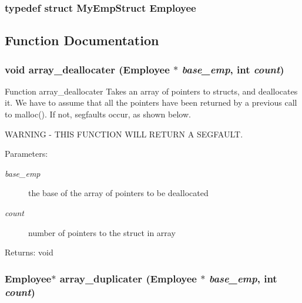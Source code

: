 \subsubsection{\setlength{\rightskip}{0pt plus 5cm}typedef struct \bf{My\-Emp\-Struct} \bf{Employee}}\label{mystructs_8h_d17652ded0ad47dadf7dc684a5873f82}




\subsection{Function Documentation}
\subsubsection{\setlength{\rightskip}{0pt plus 5cm}void array\_\-deallocater (\bf{Employee} $\ast$ {\em base\_\-emp}, int {\em count})}\label{mystructs_8h_a103294d8edeca5292a7d24428976feb}


Function array\_\-deallocater Takes an array of pointers to structs, and deallocates it. We have to assume that all the pointers have been returned by a previous call to malloc(). If not, segfaults occur, as shown below.

WARNING - THIS FUNCTION WILL RETURN A SEGFAULT.

\begin{Desc}
\item[Parameters:]
\begin{description}
\item[{\em base\_\-emp}]the base of the array of pointers to be deallocated \item[{\em count}]number of pointers to the struct in array \end{description}
\end{Desc}
\begin{Desc}
\item[Returns:]void \end{Desc}
\subsubsection{\setlength{\rightskip}{0pt plus 5cm}\bf{Employee}$\ast$ array\_\-duplicater (\bf{Employee} $\ast$ {\em base\_\-emp}, int {\em count})}\label{mystructs_8h_df3e953715ca2fbe495f259c6a2baeca}


